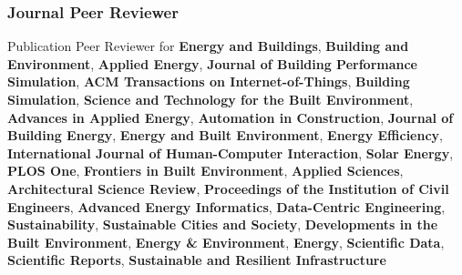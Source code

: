 \documentclass[10pt,a4paper]{article}
\begin{document}
\begin{small}
\subsubsection*{Journal Peer Reviewer}
Publication Peer Reviewer for \textbf{Energy and Buildings}, \textbf{Building and Environment}, \textbf{Applied Energy}, \textbf{Journal of Building Performance Simulation}, \textbf{ACM Transactions on Internet-of-Things}, \textbf{Building Simulation}, \textbf{Science and Technology for the Built Environment}, \textbf{Advances in Applied Energy}, \textbf{Automation in Construction}, \textbf{Journal of Building Energy}, \textbf{Energy and Built Environment}, \textbf{Energy Efficiency}, \textbf{International Journal of Human-Computer Interaction}, \textbf{Solar Energy}, \textbf{PLOS One}, \textbf{Frontiers in Built Environment}, \textbf{Applied Sciences}, \textbf{Architectural Science Review}, \textbf{Proceedings of the Institution of Civil Engineers}, \textbf{Advanced Energy Informatics}, \textbf{Data-Centric Engineering}, \textbf{Sustainability}, \textbf{Sustainable Cities and Society}, \textbf{Developments in the Built Environment}, \textbf{Energy \& Environment}, \textbf{Energy}, \textbf{Scientific Data}, \textbf{Scientific Reports}, \textbf{Sustainable and Resilient Infrastructure}


\end{small}
\end{document}
